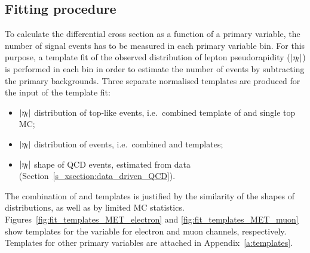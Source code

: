 \subsection{Fitting procedure}
\label{ss_xsection:fitting}
To calculate the differential cross section as a function of a primary variable, the number of signal \ttbar events has
to be measured in each primary variable bin. For this purpose, a template fit of the observed distribution of lepton
pseudorapidity ($\lvert \eta_l \rvert$) is performed in each bin in order to estimate the number of \ttbar events by
subtracting the primary backgrounds. Three separate normalised templates are produced for the input of the template fit:

\begin{itemize}
	\item $\lvert \eta_l \rvert$ distribution of top-like events, i.e.\ combined template of \ttbar and single top MC;
	\item $\lvert \eta_l \rvert$ distribution of \VpJets events, i.e.\ combined \WpJets and \ZpJets templates;
	\item $\lvert \eta_l \rvert$ shape of QCD events, estimated from data (Section~\ref{s_xsection:data_driven_QCD}).
\end{itemize}

The combination of \WpJets and \ZpJets templates is justified by the similarity of the shapes of distributions, as well
as by limited MC statistics. Figures~\ref{fig:fit_templates_MET_electron} and \ref{fig:fit_templates_MET_muon} show
templates for the \MET variable for electron and muon channels, respectively. Templates for other primary variables are
attached in Appendix~\ref{a:templates}.


